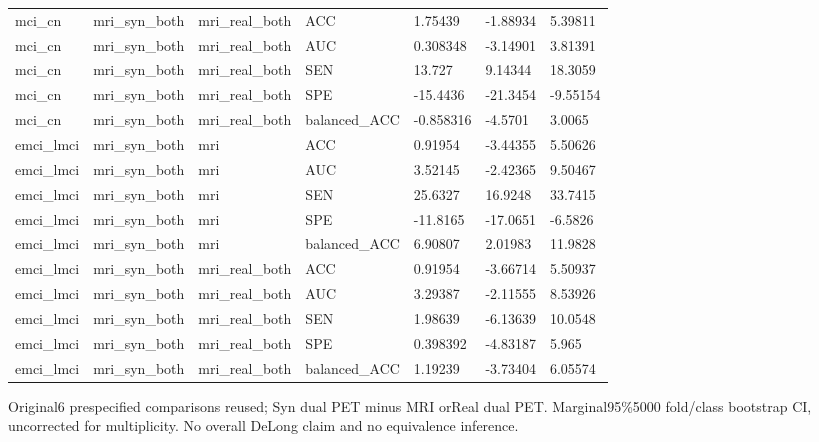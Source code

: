 \documentclass{article}
\providecommand{\DIFaddtex}[1]{{\protect\color{blue} \sf #1}} %
\providecommand{\DIFadd}[1]{\texorpdfstring{\DIFaddtex{#1}}{#1}} %
\begin{document}
\begin{landscape}
\begin{longtable}{lllllll}
mci\_cn & mri\_syn\_both & mri\_real\_both & ACC & 1.75439 & -1.88934 & 5.39811 \\
mci\_cn & mri\_syn\_both & mri\_real\_both & AUC & 0.308348 & -3.14901 & 3.81391 \\
mci\_cn & mri\_syn\_both & mri\_real\_both & SEN & 13.727 & 9.14344 & 18.3059 \\
mci\_cn & mri\_syn\_both & mri\_real\_both & SPE & -15.4436 & -21.3454 & -9.55154 \\
mci\_cn & mri\_syn\_both & mri\_real\_both & balanced\_ACC & -0.858316 & -4.5701 & 3.0065 \\
emci\_lmci & mri\_syn\_both & mri & ACC & 0.91954 & -3.44355 & 5.50626 \\
emci\_lmci & mri\_syn\_both & mri & AUC & 3.52145 & -2.42365 & 9.50467 \\
emci\_lmci & mri\_syn\_both & mri & SEN & 25.6327 & 16.9248 & 33.7415 \\
emci\_lmci & mri\_syn\_both & mri & SPE & -11.8165 & -17.0651 & -6.5826 \\
emci\_lmci & mri\_syn\_both & mri & balanced\_ACC & 6.90807 & 2.01983 & 11.9828 \\
emci\_lmci & mri\_syn\_both & mri\_real\_both & ACC & 0.91954 & -3.66714 & 5.50937 \\
emci\_lmci & mri\_syn\_both & mri\_real\_both & AUC & 3.29387 & -2.11555 & 8.53926 \\
emci\_lmci & mri\_syn\_both & mri\_real\_both & SEN & 1.98639 & -6.13639 & 10.0548 \\
emci\_lmci & mri\_syn\_both & mri\_real\_both & SPE & 0.398392 & -4.83187 & 5.965 \\
emci\_lmci & mri\_syn\_both & mri\_real\_both & balanced\_ACC & 1.19239 & -3.73404 & 6.05574 \\
\end{longtable}
\noindent\parbox{\linewidth}{\footnotesize \DIFadd{Original6 prespecified comparisons reused; Syn dual PET minus MRI orReal dual PET. Marginal95\%5000 fold/class bootstrap CI, uncorrected for multiplicity. No overall DeLong claim and no equivalence inference.}}
\endgroup
\end{landscape}

\end{document}
